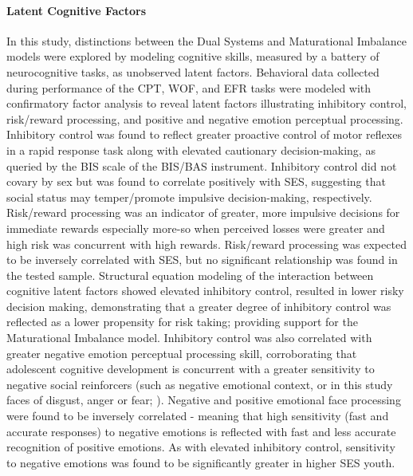 \documentclass{article}%
\begin{document}
\paragraph*{Latent Cognitive Factors} In this study, distinctions between the Dual Systems and Maturational Imbalance models were explored by modeling cognitive skills, measured by a battery of neurocognitive tasks, as unobserved latent factors. Behavioral data collected during performance of the CPT, WOF, and EFR tasks were modeled with confirmatory factor analysis to reveal latent factors illustrating inhibitory control, risk/reward processing, and positive and negative emotion perceptual processing. Inhibitory control was found to reflect greater proactive control of motor reflexes in a rapid response task along with elevated cautionary decision-making, as queried by the BIS scale of the BIS/BAS instrument. Inhibitory control did not covary by sex but was found to correlate positively with SES, suggesting that social status may temper/promote impulsive decision-making, respectively. Risk/reward processing was an indicator of greater, more impulsive decisions for immediate rewards \textemdash especially more-so when perceived losses were greater and high risk was concurrent with high rewards. Risk/reward processing was expected to be inversely correlated with SES, but no significant relationship was found in the tested sample. Structural equation modeling of the interaction between cognitive latent factors showed elevated inhibitory control, resulted in lower risky decision making, demonstrating that a greater degree of inhibitory control was reflected as a lower propensity for risk taking; providing support for the Maturational Imbalance model. Inhibitory control was also correlated with greater negative emotion perceptual processing skill, corroborating that adolescent cognitive development is concurrent with a greater sensitivity to negative social reinforcers (such as negative emotional context, or in this study faces of disgust, anger or fear; \cite{jones2014adolescent, rosenbaum2020valence}). Negative and positive emotional face processing were found to be inversely correlated - meaning that high sensitivity (fast and accurate responses) to negative emotions is reflected with fast and less accurate recognition of positive emotions. As with elevated inhibitory control, sensitivity to negative emotions was found to be significantly greater in higher SES youth. 
\end{document}

